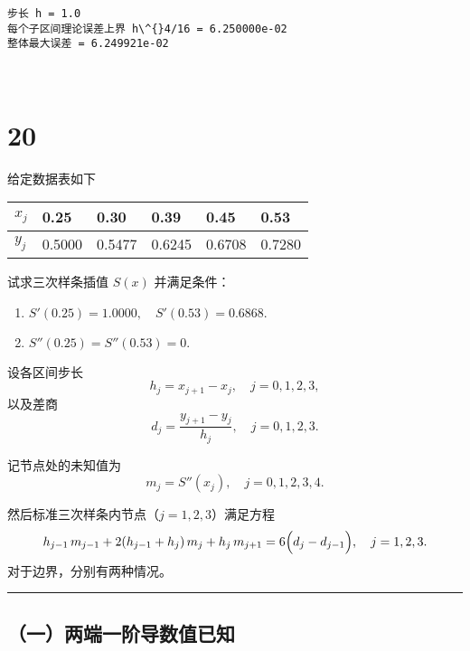 \documentclass[11pt]{article}
\providecommand{\tightlist}{%
      \setlength{\itemsep}{0pt}\setlength{\parskip}{0pt}}
\begin{document}
    \begin{Verbatim}[commandchars=\\\{\}]
步长 h = 1.0
每个子区间理论误差上界 h\^{}4/16 = 6.250000e-02
整体最大误差 = 6.249921e-02
    \end{Verbatim}

    \begin{center}
    \end{center}
    { \hspace*{\fill} \\}
    
    \section{20}\label{section}

给定数据表如下

\begin{longtable}[]{@{}llllll@{}}
\toprule\noalign{}
\(x_j\) & 0.25 & 0.30 & 0.39 & 0.45 & 0.53 \\
\midrule\noalign{}
\endhead
\bottomrule\noalign{}
\endlastfoot
\(y_j\) & 0.5000 & 0.5477 & 0.6245 & 0.6708 & 0.7280 \\
\end{longtable}

试求三次样条插值 \(S(x)\) 并满足条件：

\begin{enumerate}
\def\labelenumi{\arabic{enumi}.}
\tightlist
\item
  \(S'(0.25) = 1.0000, \quad S'(0.53) = 0.6868.\)
\item
  \(S''(0.25) = S''(0.53) = 0.\)
\end{enumerate}

设各区间步长\\
\[
h_j = x_{j+1}-x_j,\quad j=0,1,2,3,
\] 以及差商\\
\[
d_j=\frac{y_{j+1}-y_j}{h_j},\quad j=0,1,2,3.
\]

记节点处的未知值为\\
\[
m_j = S''(x_j),\quad j=0,1,2,3,4.
\]

然后标准三次样条内节点（\(j=1,2,3\)）满足方程 \[
h_{j-1}\,m_{j-1}+2(h_{j-1}+h_j)\,m_j+h_j\,m_{j+1}= 6\Bigl(d_j-d_{j-1}\Bigr),\quad j=1,2,3.
\] 对于边界，分别有两种情况。

\begin{center}\rule{0.5\linewidth}{0.5pt}\end{center}

\subsection{（一）两端一阶导数值已知}\label{ux4e00ux4e24ux7aefux4e00ux9636ux5bfcux6570ux503cux5df2ux77e5}
\end{document}
